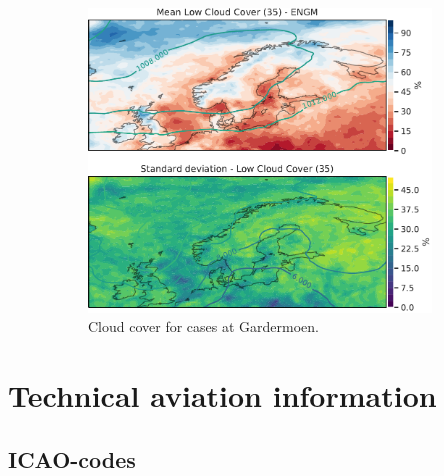 \begin{figure}
    \begin{subfigure}[b]{0.5\textwidth}
    \centering
    \includegraphics[width=\textwidth]{Figures/CCENGM.pdf}
    \caption{Cloud cover for cases at Gardermoen.}
    \label{fig:ENGMCC}
\end{subfigure}
\caption{ }
\label{fig:cloudcoverairports}
\end{figure}

\chapter{Technical aviation information}

\section{ICAO-codes}

